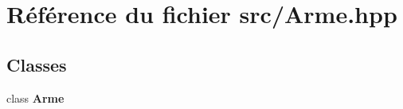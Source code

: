 \section{Référence du fichier src/\-Arme.hpp}
\label{_arme_8hpp}
\subsection*{Classes}
\begin{DoxyCompactItemize}
\item 
class {\bf Arme}
\end{DoxyCompactItemize}
